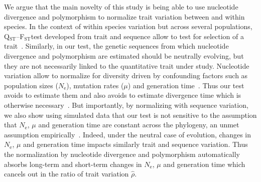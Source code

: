 \documentclass{article}
\newcommand{\QstFst}{Q$_\text{ST}$--F$_\text{ST}$}
\newcommand{\Ne}{N_{\text{e}}}
\newcommand{\MutationRate}{\mu}
\newcommand{\EstNI}{\widehat{\rho}}
\begin{document}
We argue that the main novelty of this study is being able to use nucleotide divergence and polymorphism to normalize trait variation between and within species.
In the context of within species variation but across several populations, \QstFst test developed from trait and sequence allow to test for selection of a trait~\parencite{martin_multivariate_2008, leinonen_qst_2013}.
Similarly, in our test, the genetic sequences from which nucleotide divergence and polymorphism are estimated should be neutrally evolving, but they are not necessarily linked to the quantitative trait under study.
Nucleotide variation allow to normalize for diversity driven by confounding factors such as population sizes ($\Ne$), mutation rates ($\MutationRate$) and generation time~\parencite{hansen_translating_1996, harmon_phylogenetic_2018}.
Thus our test avoids to estimate them and also avoids to estimate divergence time which is otherwise necessary~\parencite{walsh_evolution_2018}.
But importantly, by normalizing with sequence variation, we also show using simulated data that our test is not sensitive to the assumption that $\Ne$, $\MutationRate$ and generation time are constant across the phylogeny, an unmet assumption empirically~\parencite{bergeron_evolution_2023, wilder_contribution_2023}.
Indeed, under the neutral case of evolution, changes in $\Ne$, $\MutationRate$ and generation time impacts similarly trait and sequence variation.
Thus the normalization by nucleotide divergence and polymorphism automatically absorbs long-term and short-term changes in $\Ne$, $\MutationRate$ and generation time which cancels out in the ratio of trait variation $\EstNI$.
\end{document}
